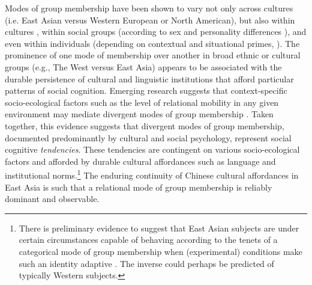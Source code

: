 \begin{CJK}{UTF8}{gbsn}
Modes of group membership have been shown to vary not only across cultures (i.e. East Asian versus Western European or North American), but also within cultures \citep{Henrich2014}, within social groups (according to sex and personality differences \citep{Yuki2014}), and even within individuals (depending on contextual and situational primes, \citep{Lee2014,Wong2005}).  The prominence of one mode of membership over another in broad ethnic or cultural groups (e.g., The West versus East Asia) appears to be associated with the durable persistence of cultural and linguistic institutions that afford particular patterns of social cognition.  Emerging research suggests that context-specific socio-ecological factors such as the level of relational mobility in any given environment may mediate divergent modes of group membership \citep{Oishi2010,Takagishi2014,Yuki2005}.
Taken together, this evidence suggests that divergent modes of group membership, documented predominantly by cultural and social psychology, represent social cognitive \textit{tendencies}. These tendencies are contingent on various socio-ecological factors and afforded by durable cultural affordances such as language and institutional norms.\footnote{There is preliminary evidence to suggest that East Asian subjects are under certain circumstances capable of behaving according to the tenets of a categorical mode of group membership when (experimental) conditions make such an identity adaptive \citep{Hong2000}. The inverse could perhaps be predicted of typically Western subjects.}  The enduring continuity of Chinese cultural affordances in East Asia is such that a relational mode of group membership is reliably dominant and observable.



\end{CJK}
